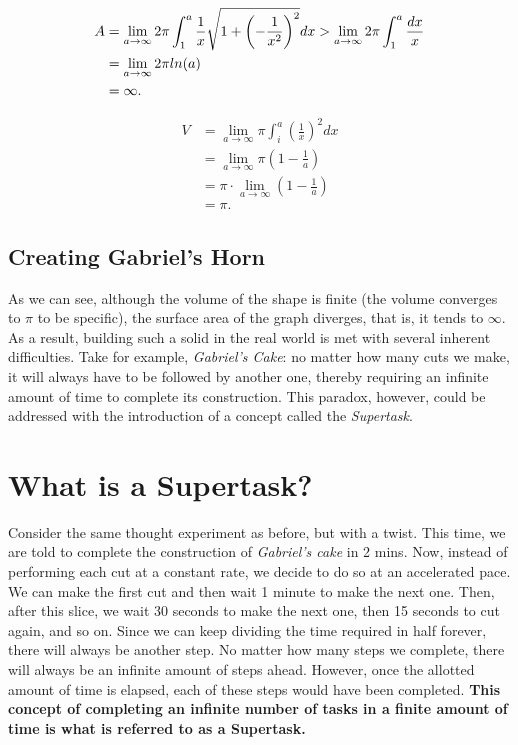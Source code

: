 \documentclass{article}
\begin{document}
\begin{equation}
  \begin{split}
    A & = \lim_{a\to\infty} 2\pi \int_{1}^{a} \frac{1}{x} \sqrt{1 + \left( -\frac{1}{x^2} \right)^2} dx > \lim_{a\to\infty} 2\pi \int_{1}^{a} \frac{dx}{x} \\
    \vspace{3mm}
    & = \lim_{a\to\infty} 2\pi ln(a)\\
    & = \infty.
  \end{split}
\end{equation}

\begin{equation}
    \begin{split}
        V & = \lim_{a\to\infty} \pi \int_{i}^{a} \left( \frac{1}{x} \right) ^2 dx \\
        & = \lim_{a\to\infty} \pi \left(1 - \frac{1}{a} \right) \\
        & = \pi \cdot \lim_{a\to\infty} \left(1 - \frac{1}{a} \right) \\
        & = \pi.
    \end{split}
\end{equation}

\subsection{Creating Gabriel's Horn}
As we can see, although the volume of the shape is finite (the volume converges to $\pi$ to be specific), the surface area of the graph diverges, that is, it tends to $\infty$. As a result, building such a solid in the real world is met with several inherent difficulties. Take for example, \textsl{Gabriel’s Cake}: no matter how many cuts we make, it will always have to be followed by another one, thereby requiring an infinite amount of time to complete its construction. This paradox, however, could be addressed with the introduction of a concept called the \textsl{Supertask}. 

\section{What is a Supertask?}
Consider the same thought experiment as before, but with a twist. This time, we are told to complete the construction of \textsl{Gabriel’s cake} in 2 mins. Now, instead of performing each cut at a constant rate, we decide to do so at an accelerated pace. We can make the first cut and then wait 1 minute to make the next one. Then, after this slice, we wait 30 seconds to make the next one, then 15 seconds to cut again, and so on. Since we can keep dividing the time required in half forever, there will always be another step. No matter how many steps we complete, there will always be an infinite amount of steps ahead. However, once the allotted amount of time is elapsed, each of these steps would have been completed. \textbf{This concept of completing an infinite number of tasks in a finite amount of time is what is referred to as a Supertask.} \cite{sep-spacetime-supertasks}
\end{document}
